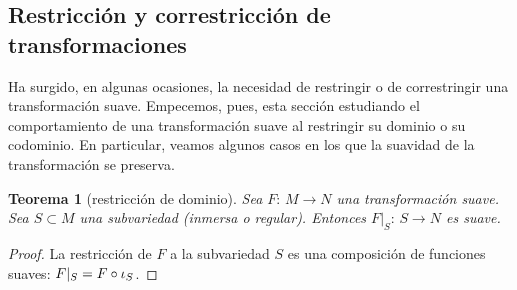 \theoremstyle{plain}
\newtheorem{teoRestringirElDominio}{Teorema}[section]
\newtheorem{teoCorrestringirElCodominio}[teoRestringirElDominio]{Teorema}
\newtheorem{teoUnicidadDeLaEstructuraRegular}[teoRestringirElDominio]{Teorema}
\newtheorem{teoUnicidadDeLaEstructuraInmersa}[teoRestringirElDominio]{Teorema}
\newtheorem{teoUnicidadDebilmenteRegular}[teoRestringirElDominio]{Teorema}
\newtheorem{lemaDeExtensiones}[teoRestringirElDominio]{Lema}
\newtheorem{propoDeNoExtensiones}[teoRestringirElDominio]{Proposici\'{o}n}
\newtheorem{propoTangenteSubvarCoordenadas}[teoRestringirElDominio]%
	{Proposici\'{o}n}
\newtheorem{propoTangenteSubvarRegularI}[teoRestringirElDominio]%
	{Proposici\'{o}n}
\newtheorem{propoTangenteSubvarRegularII}[teoRestringirElDominio]%
	{Proposici\'{o}n}
\newtheorem{propoTangenteBordeCurvas}[teoRestringirElDominio]{Proposici\'{o}n}
\newtheorem{propoBordeDeNivel}[teoRestringirElDominio]{Proposici\'{o}n}

\theoremstyle{remark}
\newtheorem{obsUnicidadDeLaEstructuraRegular}{Observaci\'{o}n}[section]
\newtheorem{obsTangenteValorRegular}[obsUnicidadDeLaEstructuraRegular]%
	{Observaci\'{o}n}
\newtheorem{obsTangenteConjuntoDeNivel}[obsUnicidadDeLaEstructuraRegular]%
	{Observaci\'{o}n}
\newtheorem{obsBordeDeNivel}[obsUnicidadDeLaEstructuraRegular]%
	{Observaci\'{o}n}
\newtheorem{obsDiferencialComoFuncional}[obsUnicidadDeLaEstructuraRegular]%
	{Observaci\'{o}n}


\subsection{Restricci\'{o}n y correstricci\'{o}n de transformaciones}
Ha surgido, en algunas ocasiones, la necesidad de restringir o de
correstringir una transformaci\'{o}n suave. Empecemos, pues, esta secci\'{o}n
estudiando el comportamiento de una transformaci\'{o}n suave al restringir
su dominio o su codominio. En particular, veamos algunos casos en los que
la suavidad de la transformaci\'{o}n se preserva.

\begin{teoRestringirElDominio}[restricci\'{o}n de dominio]%
	\label{thm:restringireldominio}
	Sea $F:\,M\rightarrow N$ una transformaci\'{o}n suave. Sea $S\subset M$
	una subvariedad (inmersa o regular). Entonces $F|_{S}:\,S\rightarrow N$
	es suave.
\end{teoRestringirElDominio}

\begin{proof}
	La restricci\'{o}n de $F$ a la subvariedad $S$ es una composici\'{o}n
	de funciones suaves: $F|_{S}=F\circ\inc[S]$.
\end{proof}

